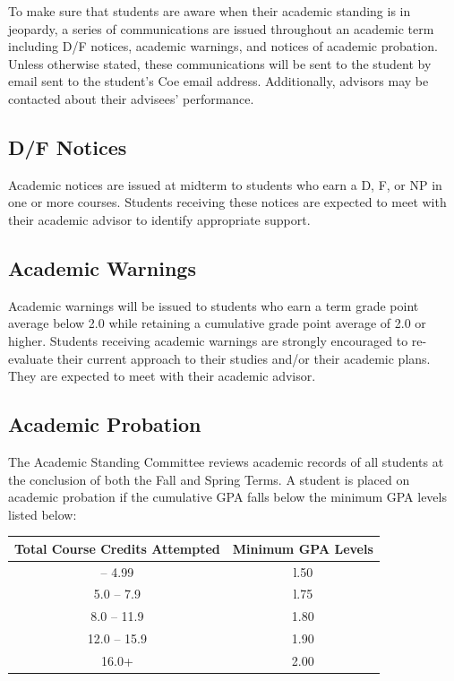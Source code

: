 \documentclass[
  letterpaper,
]{scrbook}
\renewcommand\toprule[2]\relax
\renewcommand\bottomrule[2]\relax
\newcounter{none}
\begin{document}
To make sure that students are aware when their academic standing is in
jeopardy, a series of communications are issued throughout an academic
term including D/F notices, academic warnings, and notices of academic
probation. Unless otherwise stated, these communications will be sent to
the student by email sent to the student's Coe email address.
Additionally, advisors may be contacted about their advisees'
performance.

\subsection{D/F Notices}\label{df-notices}

Academic notices are issued at midterm to students who earn a D, F, or
NP in one or more courses. Students receiving these notices are expected
to meet with their academic advisor to identify appropriate support.

\subsection{Academic Warnings}\label{academic-warnings}

Academic warnings will be issued to students who earn a term grade point
average below 2.0 while retaining a cumulative grade point average of
2.0 or higher. Students receiving academic warnings are strongly
encouraged to re-evaluate their current approach to their studies and/or
their academic plans. They are expected to meet with their academic
advisor.

\subsection{Academic Probation}\label{academic-probation}

The Academic Standing Committee reviews academic records of all students
at the conclusion of both the Fall and Spring Terms. A student is placed
on academic probation if the cumulative GPA falls below the minimum GPA
levels listed below:

{\def\LTcaptype{none} %
\begin{longtable}[]{@{}cc@{}}
\toprule\noalign{}
Total Course Credits Attempted & Minimum GPA Levels \\
\midrule\noalign{}
\endhead
\bottomrule\noalign{}
\endlastfoot
0.0 -- 4.99 & l.50 \\
5.0 -- 7.9 & l.75 \\
8.0 -- 11.9 & 1.80 \\
12.0 -- 15.9 & 1.90 \\
16.0+ & 2.00 \\
\end{longtable}
}
\end{document}
